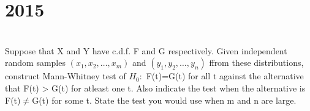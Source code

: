 \section*{2015}
\vspace{-.5cm}
\hrulefill \smallskip\\
 Suppose that X and Y have c.d.f. F and G respectively. Given independent random samples $(x_1,x_2,\ldots,x_m)$ and $(y_1,y_2,\ldots,y_n)$ ffrom these distributions, construct Mann-Whitney test of $H_0:$ F(t)=G(t) for all t against the alternative that F(t) > G(t) for atleast one t. Also indicate the test when the alternative is F(t)$\neq$G(t) for some t. State the test you would use when m and n are large.